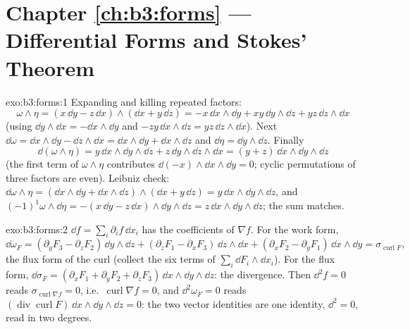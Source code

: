 \section*{Chapter \ref{ch:b3:forms} --- Differential Forms and
Stokes' Theorem}

\begin{solution}{exo:b3:forms:1}
Expanding and killing repeated factors:
\[
\omega\wedge\eta = (x\,\dd y - z\,\dd x)\wedge(\dd x +
y\,\dd z)
= -x\,\dd x\wedge\dd y + xy\,\dd y\wedge\dd z +
yz\,\dd z\wedge\dd x
\]
(using $\dd y\wedge\dd x = -\dd x\wedge\dd y$ and $-zy\,\dd
x\wedge\dd z = yz\,\dd z\wedge\dd x$). Next $\dd\omega =
\dd x\wedge\dd y - \dd z\wedge\dd x = \dd x\wedge\dd y +
\dd x\wedge\dd z$ and $\dd\eta = \dd y\wedge\dd z$. Finally
\[
\dd(\omega\wedge\eta) = y\,\dd x\wedge\dd y\wedge\dd z +
z\,\dd y\wedge\dd z\wedge\dd x = (y + z)\,\dd x\wedge\dd
y\wedge\dd z
\]
(the first term of $\omega\wedge\eta$ contributes $\dd(-x)
\wedge\dd x\wedge\dd y = 0$; cyclic permutations of three
factors are even). Leibniz check: $\dd\omega\wedge\eta =
(\dd x\wedge\dd y + \dd x\wedge\dd z)\wedge(\dd x + y\,\dd
z) = y\,\dd x\wedge\dd y\wedge\dd z$, and
$(-1)^1\omega\wedge\dd\eta = -(x\,\dd y - z\,\dd
x)\wedge\dd y\wedge\dd z = z\,\dd x\wedge\dd y\wedge\dd z$;
the sum matches.
\end{solution}

\begin{solution}{exo:b3:forms:2}
$\dd f = \sum_i\partial_if\,\dd x_i$ has the coefficients of
$\nabla f$. For the work form,
\[
\dd\omega_F = (\partial_yF_3 - \partial_zF_2)\,\dd y\wedge\dd
z + (\partial_zF_1 - \partial_xF_3)\,\dd z\wedge\dd x +
(\partial_xF_2 - \partial_yF_1)\,\dd x\wedge\dd y =
\sigma_{\operatorname{curl}F},
\]
the flux form of the curl (collect the six terms of
$\sum_i\dd F_i\wedge\dd x_i$). For the flux form,
$\dd\sigma_F = (\partial_xF_1 + \partial_yF_2 +
\partial_zF_3)\,\dd x\wedge\dd y\wedge\dd z$: the
divergence. Then $\dd^2f = 0$ reads
$\sigma_{\operatorname{curl}\nabla f} = 0$, i.e.\
$\operatorname{curl}\nabla f = 0$, and $\dd^2\omega_F = 0$
reads $(\operatorname{div}\operatorname{curl}F)\,\dd
x\wedge\dd y\wedge\dd z = 0$: the two vector identities are
one identity, $\dd^2 = 0$, read in two degrees.
\end{solution}

